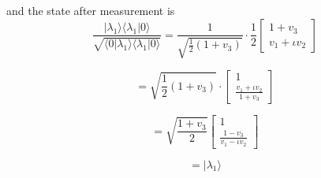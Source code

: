 and the state after measurement is 
$$ \frac{|\lambda_1\rangle \langle \lambda_1 | 0\rangle}{\sqrt{\langle 0 | \lambda_1 \rangle \langle \lambda_1| 0\rangle}} = \frac{1}{\sqrt{\frac{1}{2} ( 1 + v_3)}} \cdot \frac{1}{2}\begin{bmatrix}
    1 + v_3 \\ v_1 + \iota v_2
\end{bmatrix}$$

$$= \sqrt{\frac{1}{2}( 1 + v_3)} \cdot \begin{bmatrix}
    1  \\ \frac{v_1 + \iota v_2}{1 + v_3}
\end{bmatrix}$$

$$ = \sqrt{\frac{1+ v_3}{2}} \begin{bmatrix}
    1 \\ \frac{1 - v_3}{v_1 - \iota v_2}
\end{bmatrix}$$

$$ = |\lambda_1\rangle$$
